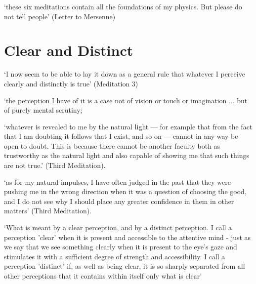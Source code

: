 \documentclass[12pt]{extarticle}
\begin{document}
\begin{multicols*}{3}
‘these six meditations contain all the foundations of my physics.  But please do not tell people’ (Letter to Mersenne)
 
 
\section{Clear and Distinct}
 
‘I now seem to be able to lay it down as a general rule that
whatever I perceive clearly and distinctly is true’
(Meditation 3)
 
‘the perception I have of it is a case not of 
vision or touch or imagination 
... but of 
purely mental scrutiny;
 
‘whatever is revealed to me by the natural light — for example that from the fact that I
am doubting it follows that I exist, and so on — cannot in any way be open to doubt.
This is because there cannot be another faculty both as trustworthy as the natural
light and also capable of showing me that such things are not true.’
(Third Meditation).
 
‘as for my natural impulses, I have often judged in the past that they were pushing me in the wrong direction when it
was a question of choosing the good, and I do not see why I should place any greater confidence in them in other
matters’
(Third Meditation).
 
‘What is meant by a clear perception, and by a distinct perception.
I
call a perception 'clear' when it is present and accessible to the
attentive mind - just as we say that we see something clearly when it is
present to the eye's gaze and stimulates it with a sufficient degree of
strength and accessibility.
I call a perception 'distinct' if, as well as
being clear, it is so sharply separated from all other perceptions that it contains
within itself only what is clear’
\citep[pp.~207--8, AT VIII:21--22]{descartes:1985_csm1}
 
    








\footnotesize


\end{multicols*}
\end{document}
